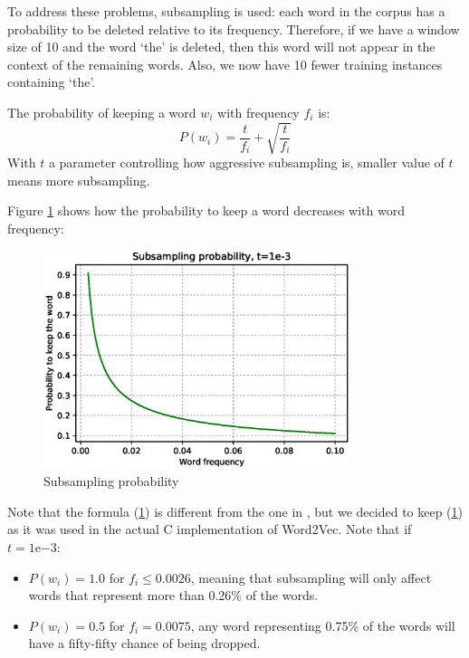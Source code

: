 To address these problems, subsampling is used: each word in the corpus has a probability to be deleted relative to its frequency. Therefore, if we have a window size of 10 and the word `the' is deleted, then this word will not appear in the context of the remaining words. Also, we now have 10 fewer training instances containing `the'.

The probability of keeping a word $w_i$ with frequency $f_i$ is:
\begin{equation}
    P(w_i) = \frac{t}{f_i} + \sqrt{\frac{t}{f_i}}
    \label{subsampling}
\end{equation}
With $t$ a parameter controlling how aggressive subsampling is, smaller value of $t$ means more subsampling. 

\newpage
Figure \ref{subsampling} shows how the probability to keep a word decreases with word frequency:
\begin{figure}[H]
    \centering
    \includegraphics[width=0.8\textwidth]{Images/subsampling_prob.eps}
    \caption{Subsampling probability}
    \label{subsampling}
\end{figure}

Note that the formula (\ref{subsampling}) is different from the one in \cite{word2vec2}, but we decided to keep (\ref{subsampling}) as it was used in the actual C implementation of Word2Vec. Note that if $t=1\mathrm{e}{-3}$:
\begin{itemize}
    \item $P(w_i) = 1.0$ for $f_i\leq0.0026$, meaning that subsampling will only affect words that represent more than 0.26\% of the words.
    \item $P(w_i) = 0.5$ for $f_i=0.0075$, any word representing 0.75\% of the words will have a fifty-fifty chance of being dropped.
\end{itemize}

